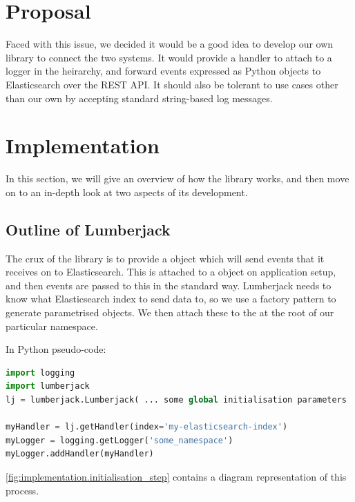 \documentclass[a4paper,11pt]{article} %
\begin{document}
\section{Proposal}
\label{sec:proposal}
Faced with this issue, we decided it would be a good idea to develop our own
library to connect the two systems.  It would provide a handler to attach to a
logger in the heirarchy, and forward events expressed as Python 
objects to Elasticsearch over the REST API.  It should also be tolerant to use
cases other than our own by accepting standard string-based log messages.

\section{Implementation}
\label{sec:implementation}
In this section, we will give an overview of how the library works, and then
move on to an in-depth look at two aspects of its development.

\subsection{Outline of Lumberjack}
\label{sec:implementation.lumberjack}
The crux of the library is to provide a  object which will
send events that it receives on to Elasticsearch.  This is attached to a
 object on application setup, and then events are passed to this
 in the standard way.  Lumberjack needs to know what
Elasticsearch index to send data to, so we use a factory pattern to generate
parametrised  objects.  We then attach these to the
 at the root of our particular namespace.

In Python pseudo-code:
\begin{lstlisting}[language=Python,basicstyle=\ttfamily]
import logging
import lumberjack
lj = lumberjack.Lumberjack( ... some global initialisation parameters ... )

myHandler = lj.getHandler(index='my-elasticsearch-index')
myLogger = logging.getLogger('some_namespace')
myLogger.addHandler(myHandler)
\end{lstlisting}

\autoref{fig:implementation.initialisation_step} contains a diagram
representation of this process.
\end{document}
